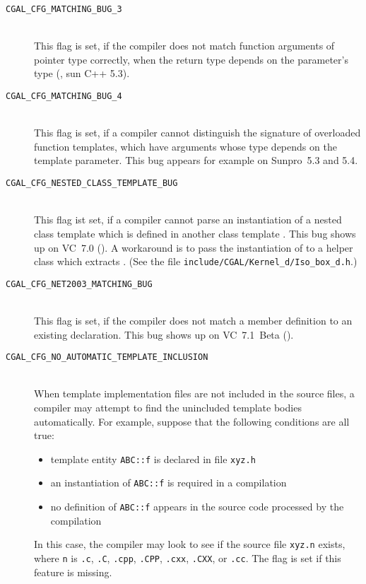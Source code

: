 \begin{description}
\item[{\tt CGAL\_CFG\_MATCHING\_BUG\_3}]~\\
 This flag is set, if the compiler does not match function arguments
 of pointer type correctly, when the return type depends on the
 parameter's type (\eg, sun C++ 5.3).

\item[{\tt CGAL\_CFG\_MATCHING\_BUG\_4}]~\\
 This flag is set, if a compiler cannot distinguish the signature of
 overloaded function templates, which have arguments whose type
 depends on the template parameter.  This bug appears for example on
 Sunpro~5.3 and 5.4.

\item[{\tt CGAL\_CFG\_NESTED\_CLASS\_TEMPLATE\_BUG}]~\\
 This flag ist set, if a compiler cannot parse an instantiation of a
 nested class template  which is defined in another class
 template . This bug shows up on VC~7.0 (). A
 workaround is to pass the instantiation of  to a helper
 class which extracts . (See the file
 \texttt{include/CGAL/Kernel\_d/Iso\_box\_d.h}.)

\item[{\tt CGAL\_CFG\_NET2003\_MATCHING\_BUG}]~\\
 This flag is set, if the compiler does not match a member definition
 to an existing declaration. This bug shows up on VC~7.1~Beta
 ().

\item[{\tt CGAL\_CFG\_NO\_AUTOMATIC\_TEMPLATE\_INCLUSION}]~\\
 When template implementation files are not included in the source files,
 a compiler may attempt to find the unincluded template bodies
 automatically. For example, suppose that the following conditions are
 all true:
 \begin{itemize}
 \item template entity {\tt ABC::f} is declared in file {\tt xyz.h}
 \item an instantiation of {\tt ABC::f} is required in a compilation
 \item no definition of {\tt ABC::f} appears in the source code processed by
       the compilation
 \end{itemize}
 In this case, the compiler may look to see if the source file {\tt xyz.n}
 exists, where {\tt n} is {\tt .c}, {\tt .C}, {\tt .cpp}, {\tt .CPP}, 
 {\tt .cxx}, {\tt .CXX}, or {\tt .cc}. The flag
 is set if this feature is missing.
 

\end{description}
